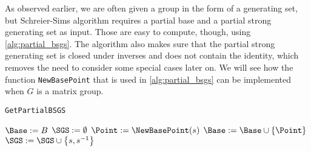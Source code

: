 As observed earlier, we are often given a group in the form of a
generating set, but Schreier-Sims algorithm requires a partial base
and a partial strong generating set as input. Those are easy to
compute, though, using \ref{alg:partial_bsgs}. The algorithm also
makes sure that the partial strong generating set is closed under
inverses and does not contain the identity, which removes the need to
consider some special cases later on. We will see how the function
\texttt{NewBasePoint} that is used in \ref{alg:partial_bsgs} can be
implemented when $G$ is a matrix group.

\begin{algorithm} 
\dontprintsemicolon
\caption{\texttt{GetPartialBSGS}}
\Begin
{
  $\Base := B$ \;
  $\SGS := \emptyset$ \;
  {
    { \label{alg:partial_bsgs_innerloop1}
      $\Point := \NewBasePoint(s)$ \;
      $\Base := \Base \cup \set{\Point}$ \; \label{alg:partial_bsgs_innerloop2} 
    }
    $\SGS := \SGS \cup \set{s, s^{-1}}$ \;
  }    
  \Return{$(\Base, \SGS)$}
}
\label{alg:partial_bsgs}
\end{algorithm}

